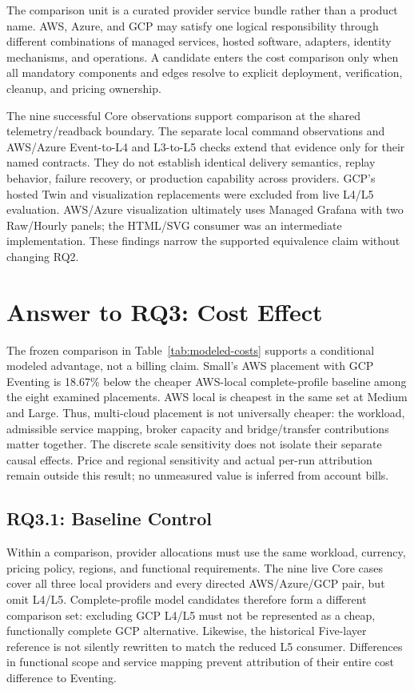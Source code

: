 The comparison unit is a curated provider service bundle rather than a product
name. AWS, Azure, and GCP may satisfy one logical responsibility through
different combinations of managed services, hosted software, adapters,
identity mechanisms, and operations. A candidate enters the cost comparison
only when all mandatory components and edges resolve to explicit deployment,
verification, cleanup, and pricing ownership.

The nine successful Core observations support comparison at the shared
telemetry/readback boundary. The separate local command observations and
AWS/Azure Event-to-L4 and L3-to-L5 checks extend that evidence only for their
named contracts. They do not establish identical delivery semantics, replay
behavior, failure recovery, or production capability across providers.
GCP's hosted Twin and visualization replacements were excluded from live L4/L5
evaluation. AWS/Azure visualization ultimately uses Managed Grafana with two
Raw/Hourly panels; the HTML/SVG consumer was an intermediate implementation.
These findings narrow the supported equivalence claim without changing RQ2.

\section{Answer to RQ3: Cost Effect}

The frozen comparison in Table~\ref{tab:modeled-costs} supports a conditional
modeled advantage, not a billing claim. Small's AWS placement with GCP Eventing
is 18.67\% below the cheaper AWS-local complete-profile baseline among the
eight examined placements. AWS local is cheapest in the same set at Medium and
Large. Thus, multi-cloud placement is not universally cheaper: the workload,
admissible service mapping, broker capacity and bridge/transfer contributions
matter together. The discrete scale sensitivity does not isolate their separate
causal effects. Price and regional sensitivity and actual per-run attribution
remain outside this result; no unmeasured value is inferred from account bills.

\subsection{RQ3.1: Baseline Control}

Within a comparison, provider allocations must use the same workload, currency,
pricing policy, regions, and functional requirements. The nine live Core cases
cover all three local providers and every directed AWS/Azure/GCP pair, but omit
L4/L5. Complete-profile model candidates therefore form a different comparison
set: excluding GCP L4/L5 must not be represented as a cheap, functionally complete
GCP alternative. Likewise, the historical Five-layer reference is not silently
rewritten to match the reduced L5 consumer. Differences in functional scope and
service mapping prevent attribution of their entire cost difference to Eventing.

